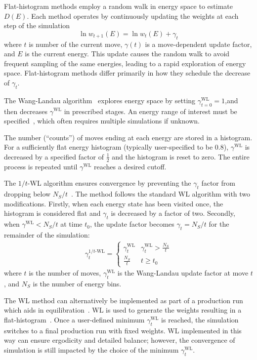 \documentclass[letterpaper,twocolumn,amsmath,amssymb,pre,aps,10pt]{revtex4-1}
\begin{document}
Flat-histogram methods employ a random walk in energy space to estimate $D(E)$.  Each method operates by continuously updating the weights at each
step of the simulation
\begin{equation}
	\ln{w_{t+1}(E)}=\ln{w_{t}(E)}
	+\gamma_t
\end{equation}
where $t$ is number of the current move, $\gamma(t)$ is a move-dependent update
factor, and $E$ is the current energy.  This update causes the random walk to
avoid frequent sampling of the same energies, leading to a rapid exploration
of energy space. Flat-histogram methods differ primarily in how they schedule
the decrease of $\gamma_t$.

The Wang-Landau algorithm~\cite{wang2001efficient,wang2001determining,
landau2014guide} explores energy space by setting $\gamma_{t=0}^{\text{WL}}=1$,and then decreases $\gamma^{\text{WL}}$ in prescribed stages. An energy range of
interest must be specified~\cite{wang2001efficient, schulz2003avoiding,yan2003fast}, which often requires multiple simulations if unknown.

The number (``counts'') of moves ending at each energy are stored in a
histogram.  For a sufficiently flat energy histogram (typically user-specified to be 0.8), $\gamma^{\text{WL}}$ is decreased by a specified factor of $\frac12$ and the histogram is reset to zero. The entire process is repeated until $\gamma^{\text{WL}}$ reaches a desired cutoff.

The $1/t$-WL algorithm ensures convergence by preventing the $\gamma_t$ factor
from dropping below $N_S/t$~\cite{belardinelli2008analysis,
schneider2017convergence}. The method follows the standard WL algorithm with two
modifications.  Firstly, when each energy state has been visited once, the histogram is considered flat and $\gamma_t$ is
decreased by a factor of two. Secondly, when
$\gamma^{\text{WL}} < N_S/t$ at time $t_0$, the update factor becomes
$\gamma_t = N_S/t$ for the remainder of the simulation:
\begin{align}
  \gamma_t^{1/t\text{-WL}} = \begin{cases}
     \gamma^{\text{WL}}_t & \gamma^{\text{WL}}_t > \frac{N_S}{t} \\
     \frac{N_S}{t} & t \ge t_0
 \end{cases}
\end{align}
where $t$ is the number of moves, $\gamma^{\text{WL}}_t$ is the Wang-Landau update factor
at move $t$, and $N_S$ is the number of energy bins.

The WL method can alternatively be implemented as part of a production run which aids in
equilibration~\cite{gross2018massively}. WL is used to generate the weights
resulting in a flat-histogram~\cite{janke2017generalized}. Once a user-defined
minimum $\gamma^{\text{WL}}_t$ is reached, the simulation switches to a final production run
with fixed weights. WL implemented in this way can ensure ergodicity and
detailed balance; however, the convergence of simulation is still impacted by
the choice of the minimum $\gamma^{\text{WL}}_t$.
\end{document}
